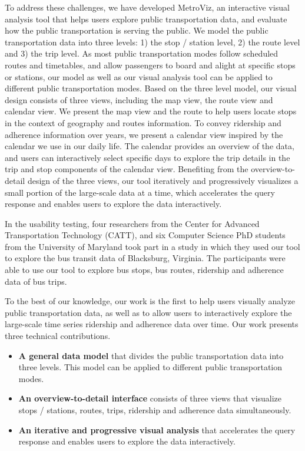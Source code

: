 \documentclass[journal]{vgtc}                %
\begin{document}
To address these challenges, we have developed MetroViz, an interactive visual analysis tool that helps users explore public transportation data, and evaluate how the public transportation is serving the public. 
We model the public transportation data into three levels: 1) the stop / station level, 2) the route level and 3) the trip level. As most public transportation modes follow scheduled routes and timetables, and allow passengers to board and alight at specific stops or stations, our model as well as our visual analysis tool can be applied to different public transportation modes. 
Based on the three level model, our visual design consists of three views, including the map view, the route view and calendar view. 
We present the map view and the route to help users locate stops in the context of geography and routes information. To convey ridership and adherence information over years, we present a calendar view inspired by the calendar we use in our daily life. The calendar provides an overview of the data, and users can interactively select specific days to explore the trip details in the trip and stop components of the calendar view. 
Benefiting from the overview-to-detail design of the three views, our tool iteratively and progressively visualizes a small portion of the large-scale data at a time, which accelerates the query response and enables users to explore the data interactively.

In the usability testing, four researchers from the Center for Advanced Transportation Technology (CATT), and six Computer Science PhD students from the University of Maryland took part in a study in which they used our tool to explore the bus transit data of Blacksburg, Virginia. The participants were able to use our tool to explore bus stops, bus routes, ridership and adherence data of bus trips.

To the best of our knowledge, our work is the first to help users visually analyze public transportation data, as well as to allow users to interactively explore the large-scale time series ridership and adherence data over time. Our work presents three technical contributions.

\begin{itemize}
  \item \textbf{A general data model} that divides the public transportation data into three levels. This model can be applied to different public transportation modes.
  \item \textbf{An overview-to-detail interface} consists of three views that visualize stops / stations, routes, trips, ridership and adherence data simultaneously.
  \item \textbf{An iterative and progressive visual analysis} that accelerates the query response and enables users to explore the data interactively.
\end{itemize}
\end{document}

